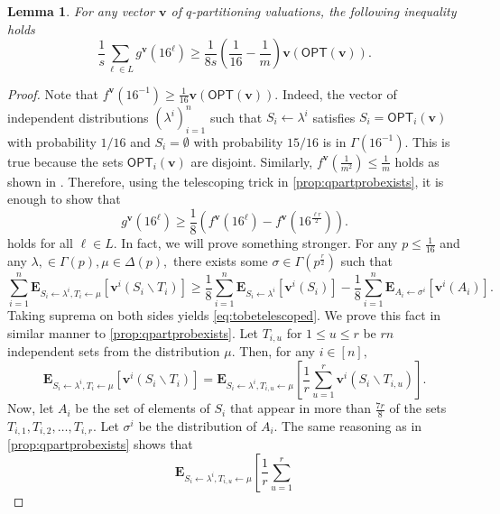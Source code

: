 \documentclass[11pt]{article}%
\newtheorem{lemma}[theorem]{Lemma}
\numberwithin{theorem}{subsection}
\newcommand{\boldv}{\mathbf{v}}
\newcommand{\opt}{\mathsf{OPT}}
\newcommand{\expect}{\mathbf{E}}
\begin{document}
\begin{lemma}
\label{lem:postedpriceswithoutexpectation}
For any vector $\boldv$ of $q$-partitioning valuations, the following inequality holds
$$
\frac{1}{s}\sum_{\ell \in L}
g^\boldv(16^\ell)\ge 
\frac{1}{8s}
\left(\frac{1}{16} - \frac{1}{m}\right)
\boldv(\opt(\boldv)).
$$
\end{lemma}
\begin{proof}
Note that $f^\boldv(16^{-1})\ge \frac{1}{16}\boldv(\opt(\boldv)).$ Indeed, the vector of independent distributions $(\lambda^i)_{i=1}^n$ such that $S_i \longleftarrow \lambda^i$ satisfies $S_i = \opt_i(\boldv)$ with probability $1/16$ and $S_i = \emptyset$ with probability $15/16$ is in $\Gamma(16^{-1}).$ This is true because the sets $\opt_i(\boldv)$ are disjoint. Similarly, 
$f^\boldv(\frac{1}{m^2})\le \frac{1}{m}$ holds as shown in \cite[Lemma A.2]{DuttingKL20}. Therefore, using the telescoping trick in \cref{prop:qpartprobexists}, it is enough to show that 
\begin{equation}
\label{eq:tobetelescoped}
g^\boldv(16^\ell)\ge 
\frac{1}{8}\left(
f^\boldv(16^{\ell}) - 
f^\boldv(16^{\frac{\ell r}{2}})\right).
\end{equation}
holds for all $\ell \in L.$ In fact, we will prove something stronger. For any $p\le \frac{1}{16}$ and any $\lambda, \in \Gamma(p),\mu \in \Delta(p),$ there exists some $\sigma \in \Gamma(p^{\frac{r}{2}})$ such that 
\begin{equation}
\label{eq:onestepminimax}
\sum_{i = 1}^n 
\expect_{S_i\longleftarrow \lambda^i, T_i \longleftarrow \mu}[\boldv^i(S_i\backslash T_i)]\ge 
\frac{1}{8}\sum_{i = 1}^n 
\expect_{S_i\longleftarrow \lambda^i}[\boldv^i(S_i)] - 
\frac{1}{8}\sum_{i = 1}^n 
\expect_{A_i\longleftarrow \sigma^i}[\boldv^i(A_i)].
\end{equation}
Taking suprema on both sides yields \cref{eq:tobetelescoped}. We prove this fact in similar manner to \cref{prop:qpartprobexists}. Let $T_{i,u}$ for  $1\le u \le r$ be $rn$ independent sets from the distribution $\mu.$ Then, for any $i \in [n],$
$$
\expect_{S_i\longleftarrow \lambda^i, T_i \longleftarrow \mu}[\boldv^i(S_i\backslash T_i)] = 
\expect_{S_i\longleftarrow \lambda^i, T_{i,u} \longleftarrow \mu}\left[\frac{1}{r}\sum_{u = 1}^r
\boldv^i(S_i\backslash T_{i,u})\right].
$$
Now, let $A_i$ be the set of elements of $S_i$ that appear in more than $\frac{7r}{8}$ of the sets 
$T_{i,1}, T_{i,2}, \ldots, T_{i,r}.$ Let $\sigma^i$ be the distribution of $A_i.$ The same reasoning as in \cref{prop:qpartprobexists} shows that 
$$
\expect_{S_i\longleftarrow \lambda^i, T_{i,u} \longleftarrow \mu}\left[\frac{1}{r}\sum_{u = 1}^r
$$
\end{proof}
\end{document}
